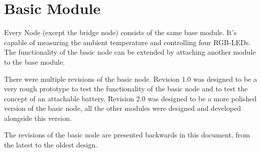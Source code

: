 \section{Basic Module}
Every Node (except the bridge node) consists of the same base module. It's
capable of measuring the ambient temperature and controlling four RGB-LEDs.
The functionality of the basic node can be extended by attaching another
module to the base module. 

There were multiple revisions of the basic node. Revision 1.0 was designed to
be a very rough prototype to test the functionality of the basic node and to 
test the concept of an attachable battery. Revision 2.0 was designed to be a 
more polished version of the basic node, all the other modules were designed 
and developed alongside this version.

The revisions of the basic node are presented backwards in this document, from
the latest to the oldest design.






